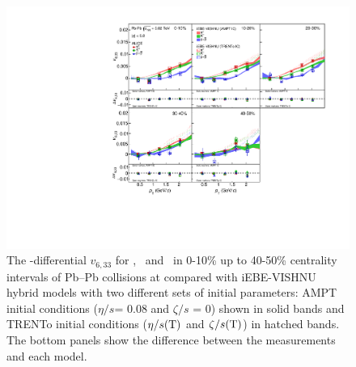 \begin{figure}[h]
\begin{center}
\includegraphics[scale=0.73]{figures/model/TrentoAndAMPT_v633_gap00_PID2.pdf}
\end{center}
\caption{The \pT-differential $v_{6,33}$ for \pion, \kaon~and \proton~in 0-10\% up to 40-50\% centrality intervals of Pb--Pb collisions at \sNN compared with iEBE-VISHNU hybrid models with two different sets of initial parameters: AMPT initial conditions ($\eta/s$= 0.08 and $\zeta/s$ = 0) shown in solid bands and TRENTo initial conditions ($\eta/s({\rm T})$ and $\zeta/s({\rm T})$) in hatched bands. The bottom panels show the difference between the measurements and each model.}
\label{v633_model}
\end{figure}

